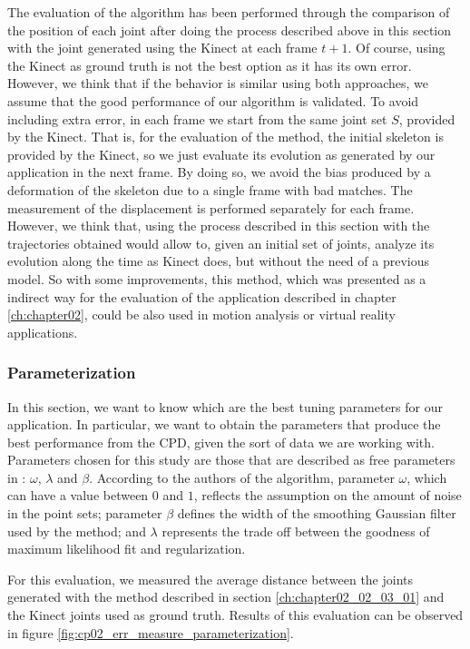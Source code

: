 The evaluation of the algorithm has been performed through the comparison of the position of each joint after doing the process 
described above in this section with the joint generated using the Kinect at each frame $t + 1$. Of course, using the Kinect as ground truth 
is not the best option as it has its own error. However, we think that if the behavior is similar using both 
approaches, we assume that the good performance of our algorithm is validated. To avoid including extra error, in each frame we start from 
the same joint set $S$, provided by the Kinect. That is, for the evaluation of the method, the initial skeleton is 
provided by the Kinect, so we just evaluate its evolution as generated by our application in the next frame. By doing so, we avoid the bias
produced by a deformation of the skeleton due to a single frame with bad matches. The measurement of the displacement is performed 
separately for each frame.
However, we think that, using the process described in this section with the trajectories obtained would allow to, 
given an initial set of joints, analyze its evolution along the time as Kinect does, but without the need of a previous 
model. So with some improvements, this method, which was presented as a indirect way for the evaluation of the application described in chapter \ref{ch:chapter02}, could be also used in motion analysis or virtual reality applications.

\subsubsection{Parameterization}\label{ch:chapter02_02_03_02}

In this section, we want to know which are the best tuning parameters for our application. In particular, we 
want to obtain the parameters that produce the best performance from the CPD, given the sort of data we are working 
with. Parameters chosen for this study are those that are described as free parameters in \cite{myronenko2010point}: 
$\omega$, $\lambda$ and $\beta$. According to the authors of the algorithm, parameter $\omega$, which can have a value 
between $0$ and $1$, reflects the assumption on the amount of noise in the point sets; parameter $\beta$ defines the 
width of the smoothing Gaussian filter used by the method; and $\lambda$ represents the trade off between the goodness 
of maximum likelihood fit and regularization.

For this evaluation, we measured the average distance between the joints generated with the method described in section \ref{ch:chapter02_02_03_01} and the Kinect joints used as ground truth. Results of this evaluation can be observed in figure \ref{fig:cp02_err_measure_parameterization}.

